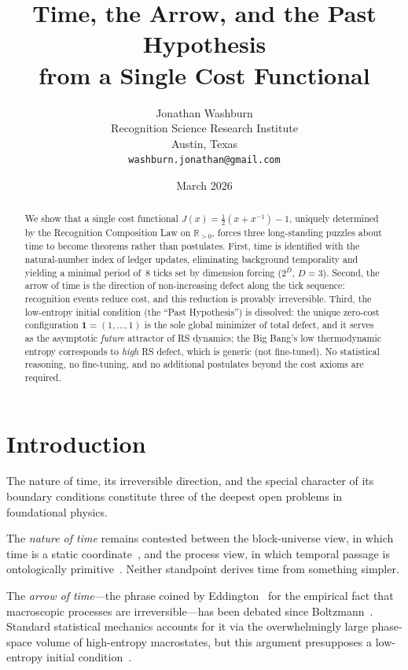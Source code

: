 \documentclass[12pt,a4paper]{article}
\title{Time, the Arrow, and the Past Hypothesis\\
from a Single Cost Functional}
\author{Jonathan Washburn\\
Recognition Science Research Institute\\
Austin, Texas\\
\texttt{washburn.jonathan@gmail.com}}
\date{March 2026}
\theoremstyle{definition}
\theoremstyle{remark}
\begin{document}
\maketitle

\begin{abstract}
We show that a single cost functional $J(x) = \tfrac{1}{2}(x + x^{-1}) - 1$,
uniquely determined by the Recognition Composition Law on $\mathbb{R}_{>0}$,
forces three long-standing puzzles about time to become theorems rather than
postulates.  First, time is identified with the natural-number index of
ledger updates, eliminating background temporality and yielding a minimal
period of~8 ticks set by dimension forcing ($2^D$, $D=3$).  Second, the
arrow of time is the direction of non-increasing defect along the tick
sequence: recognition events reduce cost, and this reduction is provably
irreversible.  Third, the low-entropy initial condition (the ``Past
Hypothesis'') is dissolved: the unique zero-cost
configuration $\mathbf{1} = (1, \ldots, 1)$ is the sole global minimizer
of total defect, and it serves as the asymptotic \emph{future} attractor
of RS dynamics; the Big Bang's low thermodynamic entropy corresponds to
\emph{high} RS defect, which is generic (not fine-tuned).  No statistical
reasoning, no fine-tuning, and no additional postulates beyond the cost
axioms are required.
\end{abstract}

\section{Introduction}
\label{sec:intro}

The nature of time, its irreversible direction, and the special character of
its boundary conditions constitute three of the deepest open problems in
foundational physics.

The \emph{nature of time} remains contested between the block-universe view,
in which time is a static coordinate~\cite{Barbour1999}, and the process
view, in which temporal passage is ontologically primitive~\cite{Smolin2013}.
Neither standpoint derives time from something simpler.

The \emph{arrow of time}---the phrase coined by
Eddington~\cite{Eddington1928} for the empirical fact that macroscopic
processes are irreversible---has been debated since
Boltzmann~\cite{Boltzmann1896}.  Standard statistical
mechanics accounts for it via the overwhelmingly large phase-space volume of
high-entropy macrostates, but this argument presupposes a low-entropy
initial condition~\cite{Penrose1989,Albert2000}.
\end{document}
